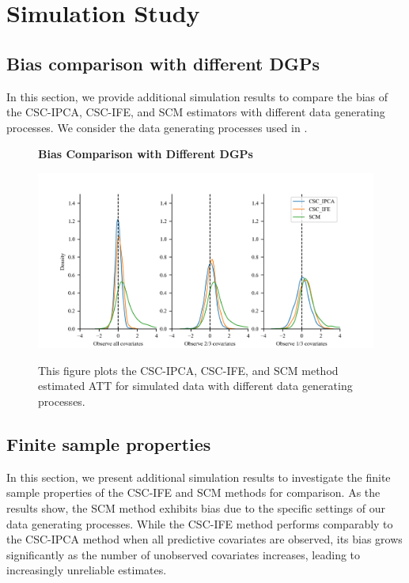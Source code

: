 \documentclass[12pt]{article}
\begin{document}
\section{Simulation Study} 
\label{sec: simulation app}

\subsection{Bias comparison with different DGPs}
In this section, we provide additional simulation results to compare the bias of the CSC-IPCA, CSC-IFE, and SCM estimators with different data generating processes. We consider the data generating processes used in \cite{xu2017generalized}.

\begin{figure}[!ht]
    \centering
    \caption{\textbf{Bias Comparison with Different DGPs}}
    \includegraphics{figs/bias_compar2.png}
    \label{app: bias 2}
    \caption*{\footnotesize{This figure plots the CSC-IPCA, CSC-IFE, and SCM method estimated ATT for simulated data with different data generating processes.}}
    \end{figure}

\subsection{Finite sample properties}
\label{app: finite sample}
In this section, we present additional simulation results to investigate the finite sample properties of the CSC-IFE and SCM methods for comparison. As the results show, the SCM method exhibits bias due to the specific settings of our data generating processes. While the CSC-IFE method performs comparably to the CSC-IPCA method when all predictive covariates are observed, its bias grows significantly as the number of unobserved covariates increases, leading to increasingly unreliable estimates.
\end{document}
